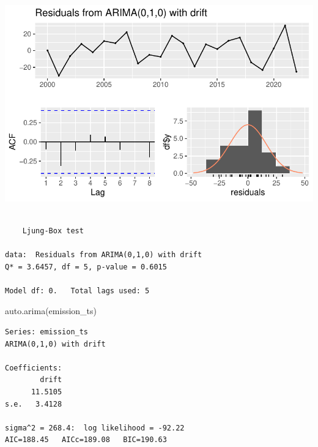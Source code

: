 \documentclass[
  letterpaper,
  DIV=11,
  numbers=noendperiod]{scrartcl}
\newenvironment{Shaded}{\begin{snugshade}}{\end{snugshade}}
\newcommand{\AttributeTok}[1]{\textcolor[rgb]{0.40,0.45,0.13}{#1}}
\newcommand{\DecValTok}[1]{\textcolor[rgb]{0.68,0.00,0.00}{#1}}
\newcommand{\FunctionTok}[1]{\textcolor[rgb]{0.28,0.35,0.67}{#1}}
\newcommand{\NormalTok}[1]{\textcolor[rgb]{0.00,0.23,0.31}{#1}}
\newcommand{\OtherTok}[1]{\textcolor[rgb]{0.00,0.23,0.31}{#1}}
\newcommand{\SpecialCharTok}[1]{\textcolor[rgb]{0.37,0.37,0.37}{#1}}
\begin{document}
\begin{Shaded}
\end{Shaded}

\includegraphics{project_files/figure-pdf/unnamed-chunk-27-1.pdf}

\begin{verbatim}

    Ljung-Box test

data:  Residuals from ARIMA(0,1,0) with drift
Q* = 3.6457, df = 5, p-value = 0.6015

Model df: 0.   Total lags used: 5
\end{verbatim}

\begin{Shaded}
\begin{Highlighting}[]
\FunctionTok{auto.arima}\NormalTok{(emission\_ts)}
\end{Highlighting}
\end{Shaded}

\begin{verbatim}
Series: emission_ts 
ARIMA(0,1,0) with drift 

Coefficients:
        drift
      11.5105
s.e.   3.4128

sigma^2 = 268.4:  log likelihood = -92.22
AIC=188.45   AICc=189.08   BIC=190.63
\end{verbatim}
\end{document}
